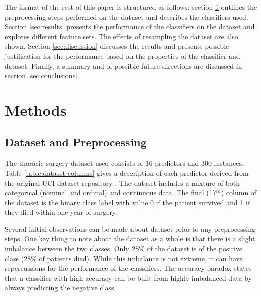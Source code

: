 \documentclass[journal]{IEEEtran}
\begin{document}
The format of the rest of this paper is structured as follows: section \ref{sec:methods} outlines the preprocessing steps performed on the dataset and describes the classifiers used. Section \ref{sec:results} presents the performance of the classifiers on the dataset and explores different feature sets. The effects of resampling the dataset are also shown. Section \ref{sec:discussion} discusses the results and presents possible justification for the performance based on the properties of the classifier and dataset. Finally, a summary and of possible future directions are discussed in section \ref{sec:conclusions}.

\section{Methods}
\label{sec:methods}

\subsection{Dataset and Preprocessing}
\label{subsec:dataset}
The thoracic surgery dataset used consists of 16 predictors and 300 instances. Table \ref{table:dataset-columns} gives a description of each predictor derived from the original UCI dataset repository \cite{uic2016thoracic}. The dataset includes a mixture of both categorical (nominal and ordinal) and continuous data. The final (17$^{th}$) column of the dataset is the binary class label with value 0 if the patient survived and 1 if they died within one year of surgery.

Several initial observations can be made about dataset prior to any preprocessing steps. One key thing to note about the dataset as a whole is that there is a slight imbalance between the two classes. Only 28\% of the dataset is of the positive class (28\% of patients died). While this imbalance is not extreme, it can have repercussions for the performance of the classifiers. The accuracy paradox \cite{bishop2006pattern} states that a classifier with high accuracy can be built from highly imbalanced data by always predicting the negative class.
\end{document}
